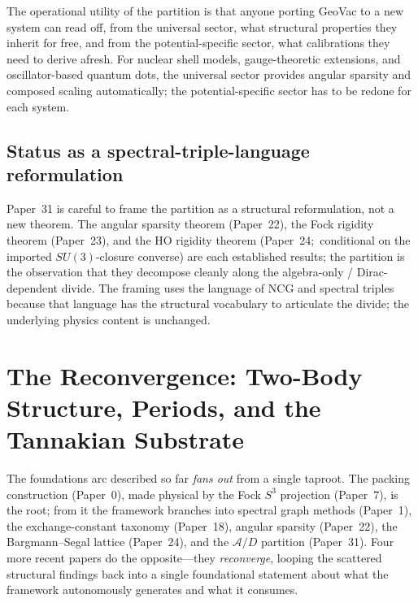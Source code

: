 \documentclass[aps,pra,twocolumn,superscriptaddress,longbibliography]{revtex4-2}
\begin{document}
The operational utility of the partition is that anyone porting GeoVac
to a new system can read off, from the universal sector, what
structural properties they inherit for free, and from the
potential-specific sector, what calibrations they need to derive
afresh.  For nuclear shell models, gauge-theoretic extensions, and
oscillator-based quantum dots, the universal sector provides angular
sparsity and composed scaling automatically; the potential-specific
sector has to be redone for each system.

\subsection*{Status as a spectral-triple-language reformulation}

Paper~31 is careful to frame the partition as a structural
reformulation, not a new theorem.  The angular sparsity theorem
(Paper~22), the Fock rigidity theorem (Paper~23), and the HO
rigidity theorem (Paper~24;\ conditional on the imported
$SU(3)$-closure converse) are each established results; the
partition is the observation that they decompose cleanly along the
algebra-only / Dirac-dependent divide.  The framing uses the language
of NCG and spectral triples because that language has the structural
vocabulary to articulate the divide; the underlying physics content
is unchanged.

\section{The Reconvergence: Two-Body Structure, Periods, and the
Tannakian Substrate}
\label{sec:reconvergence}

The foundations arc described so far \emph{fans out} from a single
taproot.  The packing construction (Paper~0), made physical by the Fock
$S^3$ projection (Paper~7), is the root; from it the framework branches
into spectral graph methods (Paper~1), the exchange-constant taxonomy
(Paper~18), angular sparsity (Paper~22), the Bargmann--Segal lattice
(Paper~24), and the $\mathcal{A}/D$ partition (Paper~31).  Four more
recent papers do the opposite---they \emph{reconverge}, looping the
scattered structural findings back into a single foundational statement
about what the framework autonomously generates and what it consumes.
\end{document}
